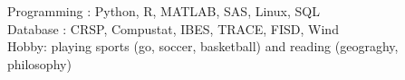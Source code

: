 \documentclass[margin]{res}
\begin{document}
\begin{resume}
Programming : Python, R, MATLAB, SAS, Linux, SQL
\\
Database : CRSP, Compustat, IBES, TRACE, FISD, Wind
\\
Hobby: playing sports (go, soccer, basketball) and reading (geograghy, philosophy)



\end{resume}
\(\)
\end{document}
